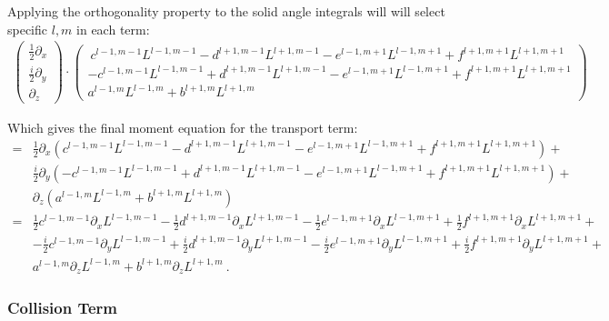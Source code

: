 \documentclass{egpubl}
\begin{document}
Applying the orthogonality property to the solid angle integrals will will select specific $l,m$ in each term:
\begin{align*}
\begin{pmatrix}
\frac{1}{2}\partial_x\\
\frac{i}{2}\partial_y\\
\partial_z
\end{pmatrix}
\cdot
\begin{pmatrix}
\ c^{l-1, m-1}L^{l-1,m-1} - d^{l+1, m-1}L^{l+1,m-1} - e^{l-1, m+1}L^{l-1,m+1} + f^{l+1, m+1}L^{l+1,m+1}\\
-c^{l-1, m-1}L^{l-1,m-1} + d^{l+1, m-1}L^{l+1,m-1} - e^{l-1, m+1}L^{l-1,m+1} + f^{l+1, m+1}L^{l+1,m+1} \\
a^{l-1, m}L^{l-1,m}+b^{l+1, m}L^{l+1,m}
\end{pmatrix}
\end{align*}

Which gives the final moment equation for the transport term:
\begin{align*}
=
&\frac{1}{2}\partial_x\left(c^{l-1, m-1}L^{l-1,m-1} - d^{l+1, m-1}L^{l+1,m-1} - e^{l-1, m+1}L^{l-1,m+1} + f^{l+1, m+1}L^{l+1,m+1}\right) + \\
&\frac{i}{2}\partial_y\left( -c^{l-1, m-1}L^{l-1,m-1} + d^{l+1, m-1}L^{l+1,m-1} - e^{l-1, m+1}L^{l-1,m+1} + f^{l+1, m+1}L^{l+1,m+1} \right) + \\
&\partial_z\left( a^{l-1, m}L^{l-1,m}+b^{l+1, m}L^{l+1,m} \right)
\\
=
&
\frac{1}{2}c^{l-1, m-1}\partial_x L^{l-1,m-1} - \frac{1}{2}d^{l+1, m-1}\partial_x L^{l+1,m-1} - \frac{1}{2}e^{l-1, m+1}\partial_x L^{l-1,m+1} + \frac{1}{2}f^{l+1, m+1}\partial_x L^{l+1,m+1}+
\\
&-\frac{i}{2}c^{l-1, m-1}\partial_y L^{l-1,m-1} + \frac{i}{2}d^{l+1, m-1}\partial_y L^{l+1,m-1} - \frac{i}{2}e^{l-1, m+1}\partial_y L^{l-1,m+1} + \frac{i}{2}f^{l+1, m+1}\partial_y L^{l+1,m+1}+
\\
&
a^{l-1, m}\partial_z L^{l-1,m}+b^{l+1, m}\partial_z L^{l+1,m} \ .
\end{align*}


\subsubsection{Collision Term}
\end{document}
